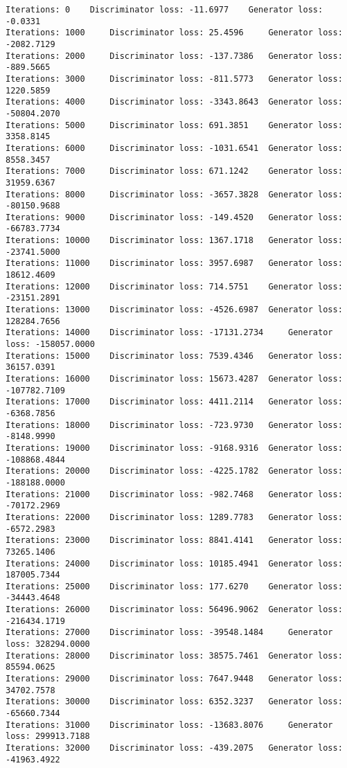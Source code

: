 \documentclass[11pt]{article}
\begin{document}
    \begin{Verbatim}[commandchars=\\\{\}]
Iterations: 0	 Discriminator loss: -11.6977	 Generator loss: -0.0331
Iterations: 1000	 Discriminator loss: 25.4596	 Generator loss: -2082.7129
Iterations: 2000	 Discriminator loss: -137.7386	 Generator loss: -889.5665
Iterations: 3000	 Discriminator loss: -811.5773	 Generator loss: 1220.5859
Iterations: 4000	 Discriminator loss: -3343.8643	 Generator loss: -50804.2070
Iterations: 5000	 Discriminator loss: 691.3851	 Generator loss: 3358.8145
Iterations: 6000	 Discriminator loss: -1031.6541	 Generator loss: 8558.3457
Iterations: 7000	 Discriminator loss: 671.1242	 Generator loss: 31959.6367
Iterations: 8000	 Discriminator loss: -3657.3828	 Generator loss: -80150.9688
Iterations: 9000	 Discriminator loss: -149.4520	 Generator loss: -66783.7734
Iterations: 10000	 Discriminator loss: 1367.1718	 Generator loss: -23741.5000
Iterations: 11000	 Discriminator loss: 3957.6987	 Generator loss: 18612.4609
Iterations: 12000	 Discriminator loss: 714.5751	 Generator loss: -23151.2891
Iterations: 13000	 Discriminator loss: -4526.6987	 Generator loss: 128284.7656
Iterations: 14000	 Discriminator loss: -17131.2734	 Generator loss: -158057.0000
Iterations: 15000	 Discriminator loss: 7539.4346	 Generator loss: 36157.0391
Iterations: 16000	 Discriminator loss: 15673.4287	 Generator loss: -107782.7109
Iterations: 17000	 Discriminator loss: 4411.2114	 Generator loss: -6368.7856
Iterations: 18000	 Discriminator loss: -723.9730	 Generator loss: -8148.9990
Iterations: 19000	 Discriminator loss: -9168.9316	 Generator loss: -108868.4844
Iterations: 20000	 Discriminator loss: -4225.1782	 Generator loss: -188188.0000
Iterations: 21000	 Discriminator loss: -982.7468	 Generator loss: -70172.2969
Iterations: 22000	 Discriminator loss: 1289.7783	 Generator loss: -6572.2983
Iterations: 23000	 Discriminator loss: 8841.4141	 Generator loss: 73265.1406
Iterations: 24000	 Discriminator loss: 10185.4941	 Generator loss: 187005.7344
Iterations: 25000	 Discriminator loss: 177.6270	 Generator loss: -34443.4648
Iterations: 26000	 Discriminator loss: 56496.9062	 Generator loss: -216434.1719
Iterations: 27000	 Discriminator loss: -39548.1484	 Generator loss: 328294.0000
Iterations: 28000	 Discriminator loss: 38575.7461	 Generator loss: 85594.0625
Iterations: 29000	 Discriminator loss: 7647.9448	 Generator loss: 34702.7578
Iterations: 30000	 Discriminator loss: 6352.3237	 Generator loss: -65660.7344
Iterations: 31000	 Discriminator loss: -13683.8076	 Generator loss: 299913.7188
Iterations: 32000	 Discriminator loss: -439.2075	 Generator loss: -41963.4922

\end{Verbatim}
\end{document}

